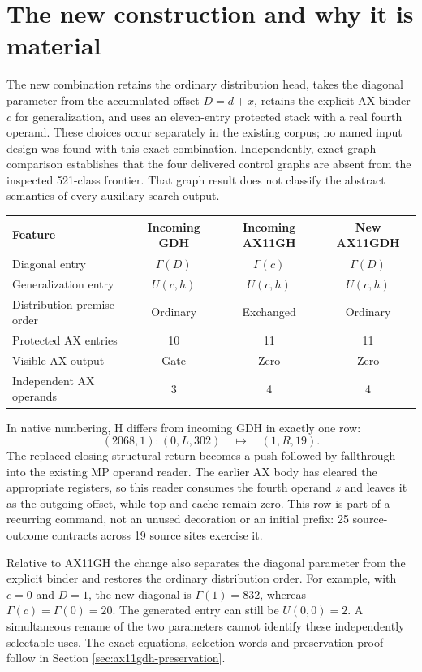 \documentclass[11pt,a4paper]{article}
\begin{document}
\section{The new construction and why it is material}
\label{sec:new-construction}

The new combination retains the ordinary distribution head, takes the
diagonal parameter from the accumulated offset $D=d+x$, retains the
explicit AX binder $c$ for generalization, and uses an eleven-entry
protected stack with a real fourth operand. These choices occur
separately in the existing corpus; no named input design was found with
this exact combination. Independently, exact graph comparison establishes
that the four delivered control graphs are absent from the inspected
521-class frontier. That graph result does not classify the abstract
semantics of every auxiliary search output.

\begin{center}
\small
\begin{tabular}{@{}lccc@{}}
\toprule
Feature & Incoming GDH & Incoming AX11GH & New AX11GDH\\
\midrule
Diagonal entry & $\Gamma(D)$ & $\Gamma(c)$ & $\Gamma(D)$\\
Generalization entry & $U(c,h)$ & $U(c,h)$ & $U(c,h)$\\
Distribution premise order & Ordinary & Exchanged & Ordinary\\
Protected AX entries & 10 & 11 & 11\\
Visible AX output & Gate & Zero & Zero\\
Independent AX operands & 3 & 4 & 4\\
\bottomrule
\end{tabular}
\end{center}

In native numbering, H differs from incoming GDH in exactly one row:
\[
 (2068,1):(0,L,302)\quad\longmapsto\quad(1,R,19).
\]
The replaced closing structural return becomes a push followed by
fallthrough into the existing MP operand reader. The earlier AX body
has cleared the appropriate registers, so this reader consumes the fourth
operand $z$ and leaves it as the outgoing offset, while top and cache
remain zero. This row is part of a recurring command, not an unused
decoration or an initial prefix: 25 source-outcome contracts across
19 source sites exercise it.

Relative to AX11GH the change also separates the diagonal parameter from
the explicit binder and restores the ordinary distribution order. For
example, with $c=0$ and $D=1$, the new diagonal is $\Gamma(1)=832$,
whereas $\Gamma(c)=\Gamma(0)=20$. The generated entry can still be
$U(0,0)=2$. A simultaneous rename of the two parameters cannot identify
these independently selectable uses. The exact equations, selection
words and preservation proof follow in Section
\ref{sec:ax11gdh-preservation}.
\end{document}
